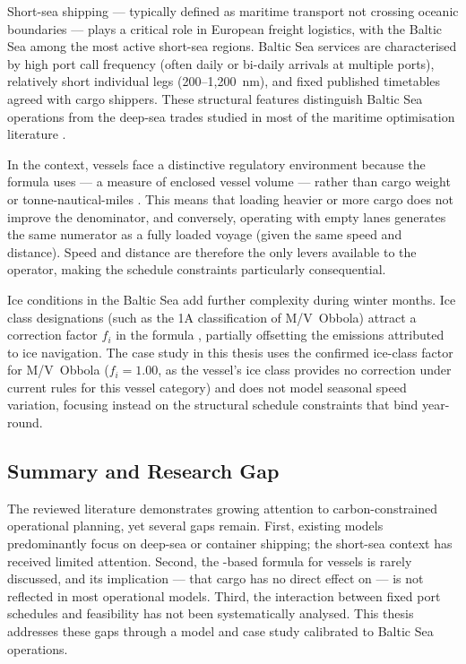 Short-sea shipping --- typically defined as maritime transport not crossing
oceanic boundaries --- plays a critical role in European freight logistics,
with the Baltic Sea among the most active short-sea regions.  Baltic Sea
\RoRo{} services are characterised by high port call frequency (often daily
or bi-daily arrivals at multiple ports), relatively short individual legs
(200--1{,}200~nm), and fixed published timetables agreed with cargo shippers.
These structural features distinguish Baltic Sea operations from the deep-sea
trades studied in most of the maritime optimisation literature
\parencite{psaraftis2013speed}.

In the \CII{} context, \RoRo{} vessels face a distinctive regulatory
environment because the \IMO{} formula uses \GT{} --- a measure of enclosed
vessel volume --- rather than cargo weight or tonne-nautical-miles
\parencite{mepc336, mepc339}.  This means that loading heavier or more cargo
does not improve the \CII{} denominator, and conversely, operating with empty
lanes generates the same \CII{} numerator as a fully loaded voyage (given the
same speed and distance).  Speed and distance are therefore the only levers
available to the operator, making the schedule constraints particularly
consequential.

Ice conditions in the Baltic Sea add further complexity during winter months.
Ice class designations (such as the 1A classification of M/V~Obbola) attract
a correction factor $f_i$ in the \CII{} formula \parencite{mepc336}, partially
offsetting the emissions attributed to ice navigation.  The case study in this
thesis uses the confirmed ice-class factor for M/V~Obbola ($f_i = 1.00$, as
the vessel's ice class provides no correction under current \IMO{} rules for
this vessel category) and does not model seasonal speed variation, focusing
instead on the structural schedule constraints that bind year-round.

\subsection{Summary and Research Gap}
\label{sec:lit:gap}

The reviewed literature demonstrates growing attention to
carbon-constrained operational planning, yet several gaps remain.
First, existing models predominantly focus on deep-sea or container
shipping; the short-sea \RoRo{} context has received limited attention.
Second, the \GT{}-based \CII{} formula for \RoRo{} vessels is rarely
discussed, and its implication --- that cargo has no direct effect on
\CII{} --- is not reflected in most operational models. Third, the
interaction between fixed port schedules and \CII{} feasibility has not
been systematically analysed. This thesis addresses these gaps through
a model and case study calibrated to Baltic Sea \RoRo{} operations.
